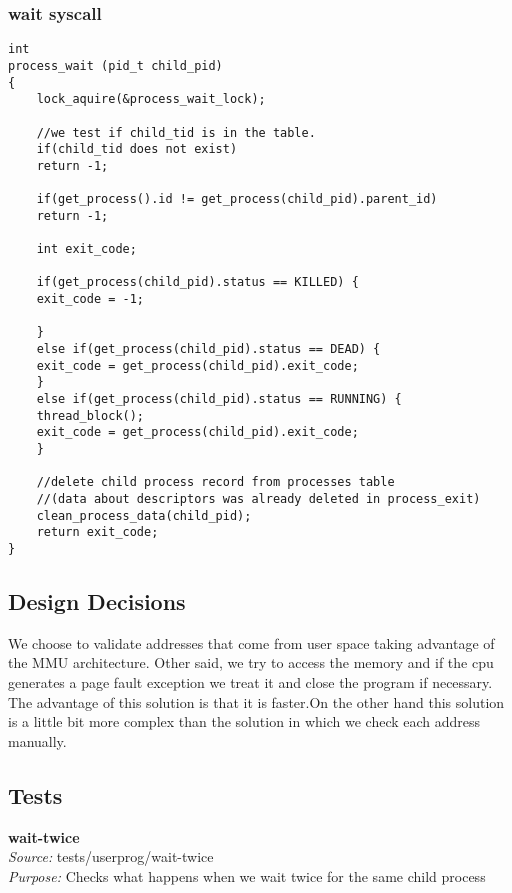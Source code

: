     \subsubsection{wait syscall}
    \vspace{-1em} %
    \begin{lstlisting}
int
process_wait (pid_t child_pid) 
{
    lock_aquire(&process_wait_lock);
    
    //we test if child_tid is in the table.
    if(child_tid does not exist) 
	return -1;

    if(get_process().id != get_process(child_pid).parent_id)
	return -1;

    int exit_code;

    if(get_process(child_pid).status == KILLED) {
	exit_code = -1;
	
    }
    else if(get_process(child_pid).status == DEAD) {
	exit_code = get_process(child_pid).exit_code;            
    }
    else if(get_process(child_pid).status == RUNNING) {
	thread_block(); 
	exit_code = get_process(child_pid).exit_code;
    }

    //delete child process record from processes table 
    //(data about descriptors was already deleted in process_exit)
    clean_process_data(child_pid);
    return exit_code;
}
    \end{lstlisting}


    \subsection{Design Decisions}

	We choose to validate addresses that come from user space taking advantage of the MMU architecture. Other said, we try to access the memory and if the cpu generates a page fault exception we treat it and close the program if necessary. The advantage of this solution is that it is faster.On the other hand this solution is a little bit more complex than the solution in which we check each address manually.

    \subsection{Tests}

      \textbf{wait-twice}\\
      \textit{Source:} tests/userprog/wait-twice\\
      \textit{Purpose:} Checks what happens when we wait twice for the same child process

